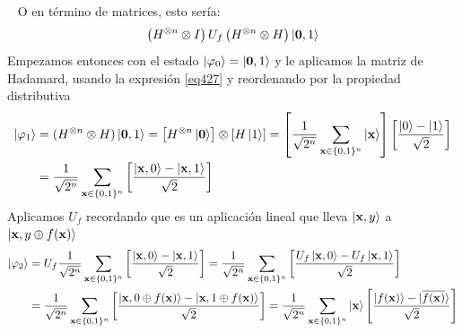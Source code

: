 \documentclass[a4paper]{article}
\numberwithin{equation}{section}
\begin{document}
\begin{figure}[h]
\centering
{}
\end{figure}\ \linebreak
O en término de matrices, esto sería:
\begin{equation}
\left( H^{\otimes n} \otimes I \right) U_f \left( H^{\otimes n} \otimes H \right) \ket{\mathbf{0}, 1}
\end{equation}
Empezamos entonces con el estado $\ket{\varphi_0} = \ket{\mathbf{0}, 1}$ y le aplicamos la matriz de Hadamard, usando la expresión \ref{eq427} y reordenando por la propiedad distributiva
\begin{equation}
\begin{split}
\ket{\varphi_1} &= (H^{\otimes n}\otimes H)\ket{\mathbf{0}, 1} =
\left[H^{\otimes n}\ket{\mathbf{0}} \right] \otimes \left[ H\ket{1} \right] =
\left[ \frac{1}{\sqrt{2^n}} \sum_{\mathbf{x}\in\{ 0, 1\}^n} \ket{\mathbf{x}} \right] \left[ \frac{\ket{0}-\ket{1}}{\sqrt{2}} \right] \\&=
\frac{1}{\sqrt{2^n}} \sum_{\mathbf{x}\in\{ 0, 1\}^n} \left[ \frac{\ket{\mathbf{x}, 0}-\ket{\mathbf{x}, 1}}{\sqrt{2}} \right]
\end{split}
\end{equation}
Aplicamos $U_f$ recordando que es un aplicación lineal que lleva $\ket{\mathbf{x}, y}$ a $\ket{\mathbf{x}, y\oplus f(\mathbf{x})}$
\begin{equation}
\begin{split}
\ket{\varphi_2} &= U_f
\frac{1}{\sqrt{2^n}} \sum_{\mathbf{x}\in\{ 0, 1\}^n} \left[ \frac{\ket{\mathbf{x}, 0}-\ket{\mathbf{x}, 1}}{\sqrt{2}} \right]
= 
\frac{1}{\sqrt{2^n}} \sum_{\mathbf{x}\in\{ 0, 1\}^n} \left[ \frac{U_f\ket{\mathbf{x}, 0} - U_f\ket{\mathbf{x}, 1}}{\sqrt{2}} \right]
\\ &=
\frac{1}{\sqrt{2^n}} \sum_{\mathbf{x}\in\{ 0, 1\}^n} \left[ \frac{\ket{\mathbf{x}, 0\oplus f(\mathbf{x})} - \ket{\mathbf{x}, 1\oplus f(\mathbf{x})}}{\sqrt{2}} \right] =
\frac{1}{\sqrt{2^n}} \sum_{\mathbf{x}\in\{ 0, 1\}^n} \ket{\mathbf{x}} \left[ \frac{\ket{f(\mathbf{x})} - \ket{\overline{f(\mathbf{x})}}}{\sqrt{2}} \right]
\end{split}
\end{equation}
\end{document}
